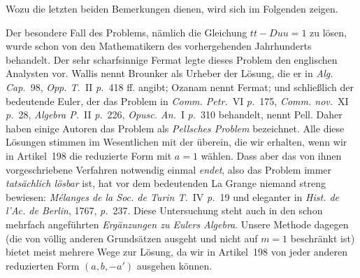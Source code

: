 Wozu die letzten beiden Bemerkungen dienen, wird sich im Folgenden zeigen.

Der besondere Fall des Problems, nämlich die Gleichung \(tt-Duu=1\) zu lösen, wurde schon von den Mathematikern des vorhergehenden Jahrhunderts behandelt. Der sehr scharfsinnige Fermat legte dieses Problem den englischen Analysten vor. Wallis nennt Brounker als Urheber der Lösung, die er in \textit{Alg. Cap.}~98, \textit{Opp. T.}~II \textit{p.}~418 ff. angibt; Ozanam nennt Fermat; und schließlich der bedeutende Euler, der das Problem in \textit{Comm. Petr.}~VI \textit{p.}~175, \textit{Comm. nov.}~XI \textit{p.}~28, \textit{Algebra P.}~II \textit{p.}~226, \textit{Opusc. An.}~I \textit{p.}~310 behandelt, nennt Pell. Daher
haben einige Autoren das Problem als \textit{Pellsches Problem} bezeichnet. Alle diese Lösungen stimmen im Wesentlichen mit der überein, die wir erhalten, wenn wir in Artikel~198 die reduzierte Form mit \(a=1\) wählen. Dass aber das von ihnen vorgeschriebene Verfahren notwendig einmal \textit{endet}, also das Problem immer \textit{tatsächlich lösbar} ist, hat vor dem bedeutenden La Grange niemand streng bewiesen: \textit{Mélanges de la Soc. de Turin T.}~IV \textit{p.}~19 und eleganter in \textit{Hist. de l'Ac. de Berlin}, 1767, \textit{p.}~237. Diese Untersuchung steht auch in den schon mehrfach angeführten \textit{Ergänzungen zu Eulers Algebra}. Unsere Methode dagegen (die von völlig anderen Grundsätzen ausgeht und nicht auf \(m=1\) beschränkt ist) bietet meist mehrere Wege zur Lösung, da wir in Artikel~198 von jeder anderen reduzierten Form \((a,b,-a')\) ausgehen können.
